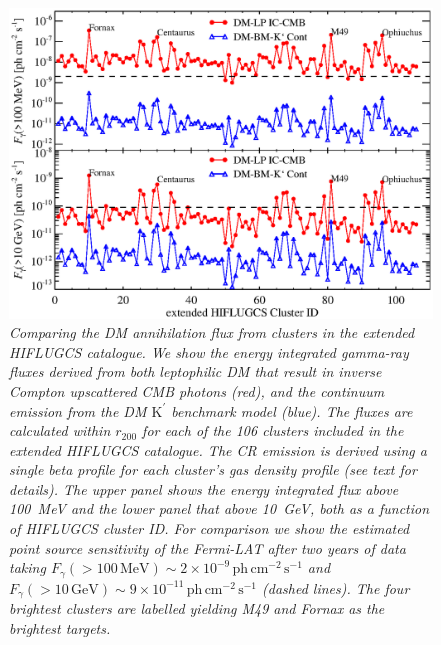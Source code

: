 \documentclass[10pt,aps,pra,reprint,amsmath,amsfonts,amssymb,showpacs,nofootinbib,floatfix]{revtex4-1}
\newcommand{\Fermi}{{\em Fermi}\xspace}
\newcommand{\rmn}{\mathrm}
\newcommand{\Kp}{\rmn{K}^\prime}
\newcommand{\rvir}{r_{200}}
\begin{document}
\begin{figure}%
\begin{minipage}{2.0\columnwidth}
 \includegraphics[width=0.99\columnwidth]{figures/Flux.comp.DM.eps}
 \caption{\it Comparing the DM annihilation flux from clusters in the
   extended HIFLUGCS catalogue. We show the energy integrated
   gamma-ray fluxes derived from both leptophilic DM that result in
   inverse Compton upscattered CMB photons (red), and the continuum
   emission from the DM $\Kp$ benchmark model (blue). The fluxes are
   calculated within $\rvir$ for each of the 106 clusters included in
   the extended HIFLUGCS catalogue. The CR emission is derived using a
   single beta profile for each cluster's gas density profile (see
   text for details). The upper panel shows the energy integrated flux
   above 100~MeV and the lower panel that above 10~GeV, both as a
   function of HIFLUGCS cluster ID. For comparison we show the
   estimated point source sensitivity of the \Fermi-LAT after two
   years of data taking $F_\gamma(>100\,\rmn{MeV})\sim
   2\times10^{-9}\,\rmn{ph}\, \rmn{cm}^{-2}\,\rmn{s}^{-1}$ and
   $F_\gamma(>10\,\rmn{GeV})\sim 9\times10^{-11}\,\rmn{ph}\,
   \rmn{cm}^{-2}\,\rmn{s}^{-1}$ (dashed lines). The four brightest
   clusters are labelled yielding M49 and Fornax as the brightest
   targets.}
 \label{fig21}
\end{minipage}
\end{figure}
\end{document}
